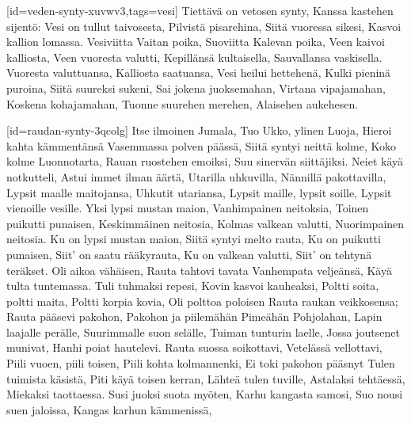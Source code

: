 [id={veden-synty-xuvwv3},tags={vesi}]
  \beginverse
    Tiettävä on vetosen synty,
    Kanssa kastehen sijentö:
    Vesi on tullut taivosesta,
    Pilvistä pisarehina,
    Siitä vuoressa sikesi,
    Kasvoi kallion lomassa.
    Vesiviitta Vaitan poika,
    Suoviitta Kalevan poika,
    Veen kaivoi kalliosta,
    Veen vuoresta valutti,
    Kepillänsä kultaisella,
    Sauvallansa vaskisella.
  \endverse
  \beginverse
    Vuoresta valuttuansa,
    Kalliosta saatuansa,
    Vesi heilui hettehenä,
    Kulki pieninä puroina,
    Siitä suureksi sukeni,
    Sai jokena juoksemahan,
    Virtana vipajamahan,
    Koskena kohajamahan,
    Tuonne suurehen merehen,
    Alaisehen aukehesen.
  \endverse
\endsong


[id={raudan-synty-3qcolg}]
  \beginverse
    Itse ilmoinen Jumala,
    Tuo Ukko, ylinen Luoja,
    Hieroi kahta kämmentänsä
    Vasemmassa polven päässä,
    Siitä syntyi neittä kolme,
    Koko kolme Luonnotarta,
    Rauan ruostehen emoiksi,
    Suu sinervän siittäjiksi.
  \endverse
  \beginverse
    Neiet käyä notkutteli,
    Astui immet ilman äärtä,
    Utarilla uhkuvilla,
    Nännillä pakottavilla,
    Lypsit maalle maitojansa,
    Uhkutit utariansa,
    Lypsit maille, lypsit soille,
    Lypsit vienoille vesille.
    Yksi lypsi mustan maion,
    Vanhimpainen neitoksia,
    Toinen puikutti punaisen,
    Keskimmäinen neitosia,
    Kolmas valkean valutti,
    Nuorimpainen neitosia.
    Ku on lypsi mustan maion,
    Siitä syntyi melto rauta,
    Ku on puikutti punaisen,
    Siit' on saatu rääkyrauta,
    Ku on valkean valutti,
    Siit' on tehtynä teräkset.
  \endverse
  \beginverse
    Oli aikoa vähäisen,
    Rauta tahtovi tavata
    Vanhempata veljeänsä,
    Käyä tulta tuntemassa.
    Tuli tuhmaksi repesi,
    Kovin kasvoi kauheaksi,
    Poltti soita, poltti maita,
    Poltti korpia kovia,
    Oli polttoa poloisen
    Rauta raukan veikkosensa;
    Rauta pääsevi pakohon,
    Pakohon ja piilemähän
    Pimeähän Pohjolahan,
    Lapin laajalle perälle,
    Suurimmalle suon selälle,
    Tuiman tunturin laelle,
    Jossa joutsenet munivat,
    Hanhi poiat hautelevi.
  \endverse
  \beginverse
    Rauta suossa soikottavi,
    Vetelässä vellottavi,
    Piili vuoen, piili toisen,
    Piili kohta kolmannenki,
    Ei toki pakohon pääsnyt
    Tulen tuimista käsistä,
    Piti käyä toisen kerran,
    Lähteä tulen tuville,
    Astalaksi tehtäessä,
    Miekaksi taottaessa.
  \endverse
  \beginverse
    Susi juoksi suota myöten,
    Karhu kangasta samosi,
    Suo nousi suen jaloissa,
    Kangas karhun kämmenissä,
